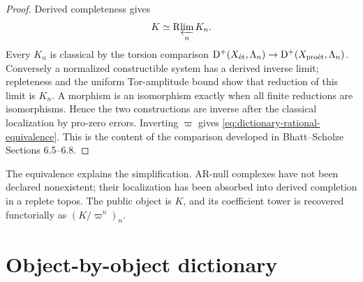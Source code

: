 \begin{proof}
Derived completeness gives
\[
 K\simeq\mathrm R\!\varprojlim_n K_n.
\]
Every \(K_n\) is classical by the torsion comparison
\(\mathrm D^+(X_{\mathrm{\acute et}},\Lambda_n)\to\mathrm D^+(X_{\mathrm{pro\acute et}},\Lambda_n)\).
Conversely a normalized constructible system has a derived inverse limit;
repleteness and the uniform Tor-amplitude bound show that reduction of this
limit is \(K_n\).  A morphism is an isomorphism exactly when all finite
reductions are isomorphisms.  Hence the two constructions are inverse after
the classical localization by pro-zero errors.  Inverting \(\varpi\) gives
\eqref{eq:dictionary-rational-equivalence}.  This is the content of the
comparison developed in Bhatt--Scholze Sections 6.5--6.8.
\end{proof}

\begin{proetalebox}
The equivalence explains the simplification.  AR-null complexes have not
been declared nonexistent; their localization has been absorbed into
derived completion in a replete topos.  The public object is \(K\), and its
coefficient tower is recovered functorially as \((K/\varpi^n)_n\).
\end{proetalebox}

\section{Object-by-object dictionary}


